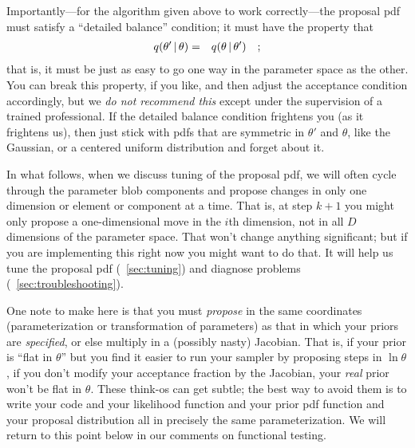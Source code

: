 \documentclass[12pt,twoside,pdftex]{article}
\newcommand{\pars}{\theta}
\begin{document}
Importantly---for the algorithm given above to work correctly---the
  proposal pdf must satisfy a ``detailed balance'' condition; it
  must have the property that
\begin{eqnarray}
q(\pars'\given\pars) &=& q(\pars\given\pars')
\quad ;
\end{eqnarray}
that is, it must be just as easy to go one way in the parameter space
  as the other.
You can break this property, if you like, and then adjust the
  acceptance condition accordingly, but we \emph{do not recommend this}
  except under the supervision of a trained professional.
If the detailed balance condition frightens you (as it frightens us),
  then just stick with pdfs that are symmetric in $\pars'$ and $\pars$,
  like the Gaussian, or a centered uniform distribution and forget about
  it.

In what follows, when we discuss tuning of the proposal pdf, we will
  often cycle through the parameter blob components and propose changes
  in only one dimension or element or component at a time.
That is, at step $k+1$ you might only propose a one-dimensional move
  in the $i$th dimension, not in all $D$ dimensions of the parameter
  space.
That won't change anything significant; but if you are implementing
  this right now you might want to do that.
It will help us tune the proposal pdf (\sectionname~\ref{sec:tuning})
and diagnose problems (\sectionname~\ref{sec:troubleshooting}).

One note to make here
  is that you must \emph{propose}
  in the same coordinates (parameterization or transformation of parameters)
  as that in which your priors are \emph{specified},
  or else multiply in a (possibly nasty) Jacobian.
That is, if your prior is ``flat in $\pars$''
  but you find it easier to run your sampler by proposing steps in $\ln \pars$,
  if you don't modify your acceptance fraction by the Jacobian,
  your \emph{real} prior won't be flat in $\pars$.
These think-os can get subtle;
  the best way to avoid them
  is to write your code and your likelihood function
  and your prior pdf function and your proposal distribution
  all in precisely the same parameterization.
We will return to this point below in our comments on functional testing.
\end{document}
